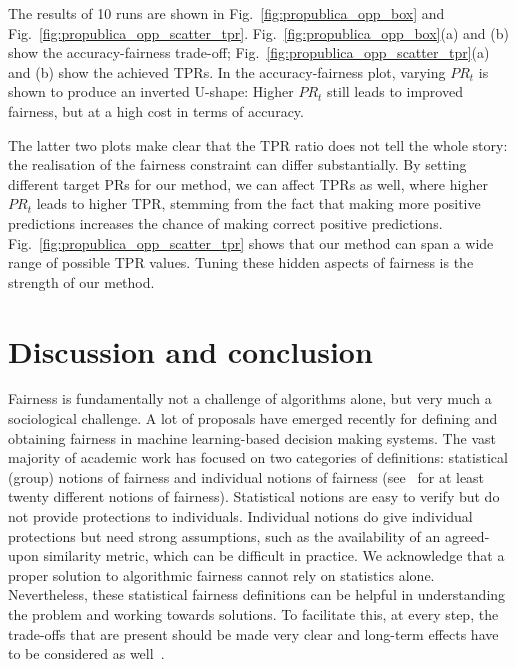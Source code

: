 The results of 10 runs are shown in Fig.~\ref{fig:propublica_opp_box} and Fig.~\ref{fig:propublica_opp_scatter_tpr}.
Fig.~\ref{fig:propublica_opp_box}(a) and (b) show the accuracy-fairness trade-off;
Fig.~\ref{fig:propublica_opp_scatter_tpr}(a) and (b) show the achieved TPRs.
In the accuracy-fairness plot, varying $\mathit{PR}_t$ is shown to produce an inverted U-shape:
Higher $\mathit{PR}_t$ still leads to improved fairness, but at a high cost in terms of accuracy.

The latter two plots make clear that the TPR ratio does not tell the whole story:
the realisation of the fairness constraint can differ substantially.
By setting different target PRs for our method, we can affect TPRs as well,
where higher $\mathit{PR}_t$ leads to higher TPR,
stemming from the fact that making more positive predictions increases the chance of making correct positive predictions.
Fig.~\ref{fig:propublica_opp_scatter_tpr} shows that our method can span a wide range of possible TPR values.
Tuning these hidden aspects of fairness is the strength of our method.

\section{Discussion and conclusion}
Fairness is fundamentally not a challenge of algorithms alone, but very much a sociological challenge.
%
A lot of proposals have emerged recently for defining and obtaining fairness in machine learning-based decision making systems. 
%
The vast majority of academic work has focused on two categories of definitions: statistical (group) notions of fairness and individual notions of fairness (see~\citet{verma2018fairness} for at least twenty different notions of fairness).
%
Statistical notions are easy to verify but do not provide protections to individuals. 
%
Individual notions do give individual protections but need strong assumptions, such as the availability of an agreed-upon similarity metric, which can be difficult in practice.
%
We acknowledge that a proper solution to algorithmic fairness cannot rely on statistics alone.
%
Nevertheless, these statistical fairness definitions can be helpful in understanding the problem and working towards solutions.
%
To facilitate this, at every step, the trade-offs that are present should be made very clear
and long-term effects have to be considered as well~\citep{liu2018delayed,kallus2018residual}.


